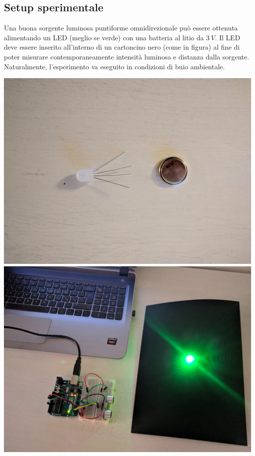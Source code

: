 \documentclass[11pt]{article}
\makeatletter
\def\maxwidth{\ifdim\Gin@nat@width>\linewidth\linewidth
    \else\Gin@nat@width\fi}
\let\Oldincludegraphics\includegraphics
\renewcommand{\includegraphics}[1]{\Oldincludegraphics[width=.8\maxwidth]{#1}}
\makeatother
\begin{document}
    \hypertarget{setup-sperimentale}{%
\subsection{Setup sperimentale}\label{setup-sperimentale}}

Una buona sorgente luminosa puntiforme omnidirezionale può essere
ottenuta alimentando un LED (meglio se verde) con una batteria al litio
da \(3\: V\). Il LED deve essere inserito all'interno di un cartoncino
nero (come in figura) al fine di poter misurare contemporaneamente
intensità luminosa e distanza dalla sorgente. Naturalmente,
l'esperimento va eseguito in condizioni di buio ambientale.

\includegraphics{led.jpeg} \includegraphics{setup.jpeg}
\end{document}
